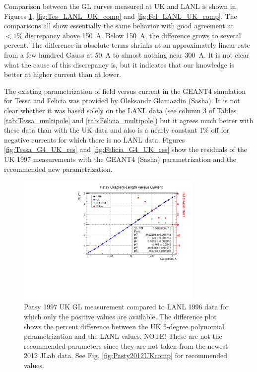 \documentclass[12pt]{article}
\begin{document}
Comparison between the GL curves measured at UK and LANL is shown in Figures \ref{fig:Pat_LANL_UK_comp}, \ref{fig:Tes_LANL_UK_comp} and \ref{fig:Fel_LANL_UK_comp}. The comparisons all show essentially the same behavior with good agreement at $<1\%$ discrepancy above 150~A. Below 150~A, the difference grows to several percent. The difference in absolute terms shrinks at an approximately linear rate from a few hundred Gauss at 50~A to almost nothing near 300~A. It is not clear what the cause of this discrepancy is, but it indicates that our knowledge is better at higher current than at lower. 

The existing parametrization of field versus current in the GEANT4 simulation for Tessa and Felicia was provided by Oleksandr Glamazdin (Sasha). It is not clear whether it was based solely on the LANL data (see column 3 of Tables \ref{tab:Tessa_multipole} and \ref{tab:Felicia_multipole}) but it agrees much better with these data than with the UK data and also is a nearly constant 1\% off for negative currents for which there is no LANL data. Figures \ref{fig:Tessa_G4_UK_res} and \ref{fig:Felicia_G4_UK_res} show the residuals of the UK 1997 measurements with the GEANT4 (Sasha) parametrization and the recommended new parametrization. 
\begin{figure}[!h]
\centering
\includegraphics[width=0.8\textwidth]{Pat_LANL_UK_GLcomp.pdf}
\caption{\label{fig:Pat_LANL_UK_comp} Patsy 1997 UK GL measurement compared to LANL 1996 data for which only the positive values are available. The difference plot shows the percent difference between the UK 5-degree polynomial parametrization and the LANL values. NOTE! These are not the recommended parameters since they are not taken from the newest 2012 JLab data. See Fig. \ref{fig:Pasty2012UKcomp} for recommended values.}
\end{figure}
\end{document}
